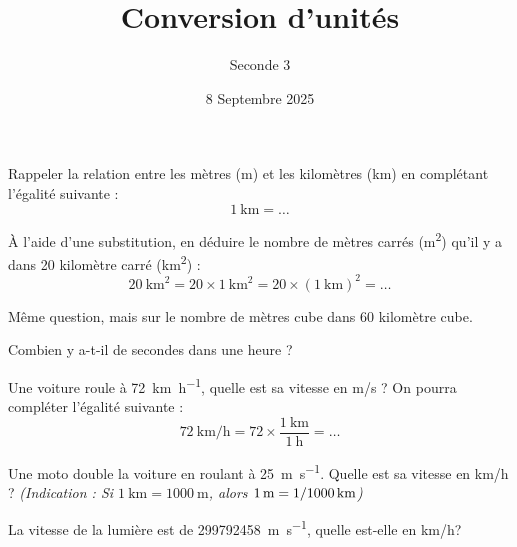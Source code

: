 \documentclass{article}
\title{Conversion d'unités}
\author{Seconde 3}
\date{8 Septembre 2025}
\begin{document}
\maketitle
\begin{alphaquestions}
\item Rappeler la relation entre les mètres (\unit{\meter}) et les kilomètres (\unit{\kilo\meter}) en complétant l'égalité suivante :
\begin{equation*}
\qty{1}{\kilo\meter} = \dots
\end{equation*}
\item À l'aide d'une substitution, en déduire le nombre de mètres carrés (\unit{\meter^2}) qu'il y a dans \num{20} kilomètre carré (\unit{\kilo\meter^2}) :
\begin{equation*}
\qty{20}{\kilo\meter^2} = 20 \times \qty{1}{\kilo\meter\squared} = 20 \times (\qty{1}{\kilo\meter})^2 = \dots
\end{equation*}
\item Même question, mais sur le nombre de mètres cube dans \num{60} kilomètre cube.
\item Combien y a-t-il de secondes dans une heure ?
\item Une voiture roule à \qty[per-mode = symbol]{72}{\kilo\meter\per\hour}, quelle est sa vitesse en \unit[per-mode = symbol]{\meter\per\second} ? On pourra compléter l'égalité suivante :
\begin{equation*}
\qty[per-mode = fraction]{72}{\kilo\meter\per\hour} = 72 \times \dfrac{\qty{1}{\kilo\meter}}{\qty{1}{\hour}} = \dots 
\end{equation*}
\item Une moto double la voiture en roulant à \qty[per-mode = symbol]{25}{\meter\per\second}. Quelle est sa vitesse en \unit[per-mode = symbol]{\kilo\meter\per\hour} ? \emph{(Indication : Si $\qty{1}{\kilo\meter} = \qty{1000}{\meter}$, alors $\qty{1}{\meter} = \qty[parse-numbers = false]{1/1000}{\kilo\meter}$)}
\item La vitesse de la lumière est de \qty[per-mode = symbol]{299 792 458}{\meter\per\second}, quelle est-elle en \unit[per-mode = symbol]{\kilo\meter\per\hour}? 
\end{alphaquestions}
\end{document}
